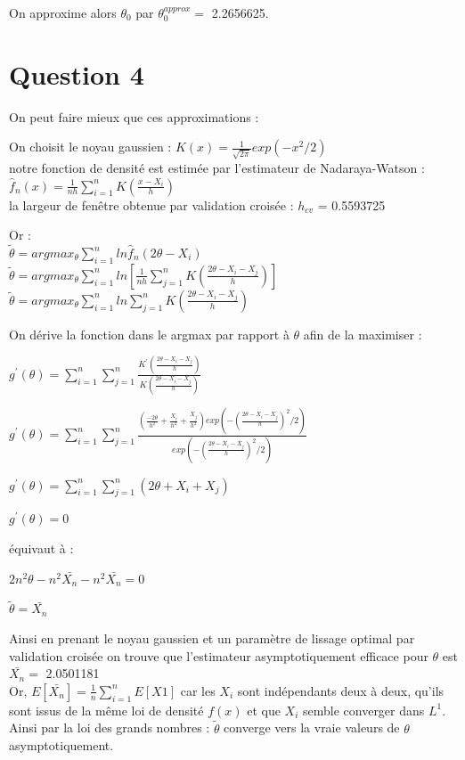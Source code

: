\documentclass[
]{article}
\begin{document}
On approxime alors \(\theta_{0}\) par \(\theta_{0}^{approx} =\)
2.2656625.

\hypertarget{question-4}{%
\section{Question 4}\label{question-4}}

On peut faire mieux que ces approximations :

On choisit le noyau gaussien :
\(K(x) = \frac{1}{\sqrt{2\pi}}exp(-x^2/2)\)\\
notre fonction de densité est estimée par l'estimateur de
Nadaraya-Watson :
\(\hat{f}_{n}(x)=\frac{1}{nh}\sum_{i=1}^{n}K(\frac{x-X_i}{h})\)\\
la largeur de fenêtre obtenue par validation croisée : \(h_{cv}\) =
0.5593725

Or :\\
\(\tilde{\theta} = argmax_{\theta} \sum^{n}_{i=1}ln\hat{f}_{n}(2\theta-X_i)\)\\
\(\tilde{\theta} = argmax_{\theta}\sum_{i=1}^{n}ln[\frac{1}{nh}\sum_{j=1}^{n}K(\frac{2\theta-X_i-X_j}{h})]\)\\
\(\tilde{\theta} = argmax_{\theta}\sum_{i=1}^{n}ln\sum_{j=1}^{n}K(\frac{2\theta-X_i-X_j}{h})\)

On dérive la fonction dans le argmax par rapport à \(\theta\) afin de la
maximiser :

\(g^{'}(\theta)= \sum^{n}_{i=1}\sum^{n}_{j=1}\frac{K^{'}(\frac{2\theta-X_i-X_j}{h})}{K(\frac{2\theta-X_i-X_j}{h})}\)

\(g^{'}(\theta)= \sum^{n}_{i=1}\sum^{n}_{j=1}\frac{(\frac{-2\theta}{h^2} + \frac{X_i}{h^2} + \frac{X_j}{h^2})exp(-(\frac{2\theta - X_i -X_j}{h})^2/2)}{exp(-(\frac{2\theta - X_i -X_j}{h})^2/2)}\)

\(g^{'}(\theta)= \sum^{n}_{i=1}\sum^{n}_{j=1}(2\theta + X_i + X_j)\)

\(g^{'}(\theta)= 0\)

équivaut à :

\(2n^{2}\theta - n^{2}\bar{X_n} - n^{2}\bar{X_n}=0\)

\(\tilde{\theta} = \bar{X_n}\)

Ainsi en prenant le noyau gaussien et un paramètre de lissage optimal
par validation croisée on trouve que l'estimateur asymptotiquement
efficace pour \(\theta\) est \(\bar{X_n}=\) 2.0501181\\
Or, \(E[\bar{X_n}] = \frac{1}{n}\sum_{i=1}^{n}E[X1]\) car les \(X_i\)
sont indépendants deux à deux, qu'ils sont issus de la même loi de
densité \(f(x)\) et que \(X_i\) semble converger dans \(L^1\). Ainsi par
la loi des grands nombres : \(\tilde{\theta}\) converge vers la vraie
valeurs de \(\theta\) asymptotiquement.
\end{document}

